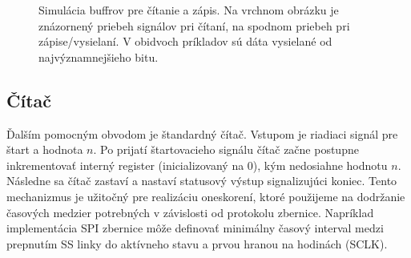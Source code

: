 \begin{figure}
    \centering
    \vfill
    \caption[Simulácia buffrov pre čítanie a zápis]{Simulácia buffrov pre čítanie a zápis. Na vrchnom obrázku je znázornený priebeh signálov pri čítaní, na spodnom priebeh pri zápise/vysielaní. V obidvoch príkladov sú dáta vysielané od najvýznamnejšieho bitu.}
    \label{obr:bufferSim}
\end{figure}

\subsection{Čítač}
Ďalším pomocným obvodom je štandardný čítač. Vstupom je riadiaci signál pre štart a hodnota $n$. Po prijatí štartovacieho signálu čítač začne postupne inkrementovať interný register (inicializovaný na 0), kým nedosiahne hodnotu $n$. Následne sa čítač zastaví a nastaví statusový výstup signalizujúci koniec. Tento mechanizmus je užitočný pre realizáciu oneskorení, ktoré použijeme na dodržanie časových medzier potrebných v závislosti od protokolu zbernice. Napríklad implementácia SPI zbernice môže definovať minimálny časový interval medzi prepnutím SS linky do aktívneho stavu a prvou hranou na hodinách (SCLK).


